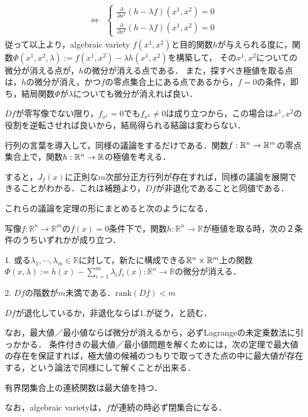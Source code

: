 \documentclass[uplatex, dvipdfmx]{jsreport}
\begin{document}
\begin{example}[２変数の場合のLagrangeの未定乗数法に全てがある]
\begin{align*}
        \Leftrightarrow& \begin{cases}\frac{\partial}{\partial x^1}(h-\lambda f)(x^1,x^2)=0\\\frac{\partial}{\partial x^2}(h-\lambda f)(x^1,x^2)=0\end{cases}
    \end{align*}
    従って以上より，algebraic variety $f(x^1,x^2)$と目的関数$h$が与えられる度に，関数$\Phi(x^1,x^2,\lambda):=f(x^1,x^2)-\lambda h(x^1,x^2)$を構築して，
    その$x^1,x^2$についての微分が消える点が，$h$の微分が消える点である．
    また，探すべき極値を取る点は，$h$の微分が消え，かつ$f$の零点集合上にある点であるから，$f=0$の条件，即ち，結局関数$\Phi$が$\lambda$についても微分が消えれば良い．

    $Df$が零写像でない限り，$f_{x^1}=0$でも$f_{x^2}\ne 0$は成り立つから，この場合は$x^1,x^2$の役割を逆転させれば良いから，結局得られる結論は変わらない．
\end{example}

\begin{example}[n変数の場合のLagrangeの未定乗数法は線型代数の言葉への拡張である]
    行列の言葉を導入して，同様の議論をするだけである．関数$f:\mathbb{R}^n\to\mathbb{R}^m$の零点集合上で，関数$h:\mathbb{R}^n\to\mathbb{R}$の極値を考える．

    すると，$J_f(x)$に正則な$m$次部分正方行列が存在すれば，同様の議論を展開できることがわかる．これは補題より，$Df$が非退化であることと同値である．
\end{example}
これらの議論を定理の形にまとめると次のようになる．

\begin{shadebox}\begin{theorem}
    写像$f:\mathbb{R}^n\to\mathbb{R}^m$の$f(x)=0$条件下で，関数$h:\mathbb{R}^n\to\mathbb{R}$が極値を取る時，次の２条件のうちいずれかが成り立つ．

    1. 或る$\lambda_1,\cdots,\lambda_m\in\mathbb{R}$に対して，新たに構成できる$\mathbb{R}^n\times\mathbb{R}^m$上の関数$\Phi(x,\lambda):=h(x)-\sum^m_{i=1}\lambda_if_i(x):\mathbb{R}^n\to\mathbb{R}$の微分が消える．

    2. $Df$の階数が$m$未満である．$\mathrm{rank}(Df)<m$
\end{theorem}\end{shadebox}
\begin{remark}
    $Df$が退化しているか，非退化ならば1.が従う，と読む．
\end{remark}

なお，最大値／最小値ならば微分が消えるから，必ずLagrangeの未定乗数法に引っかかる．
条件付きの最大値／最小値問題を解くためには，次の定理で最大値の存在を保証すれば，極大値の候補のつもりで取ってきた点の中に最大値が存在する，という論法で同様にして解くことが出来る．
\begin{lemma}
    有界閉集合上の連続関数は最大値を持つ．
\end{lemma}
なお，algebraic varietyは，$f$が連続の時必ず閉集合になる．
\end{document}
